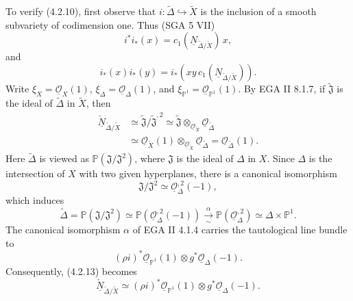 To verify (4.2.10), first observe that
$i:\widetilde\Delta\hookrightarrow\widetilde X$ is the inclusion of a
smooth subvariety of codimension one.  Thus (SGA 5 VII)
\begin{equation}\tag{4.2.11}
i^*i_*(x)=c_1(\underline N_{\widetilde\Delta/\widetilde X})\,x,
\end{equation}
and
\begin{equation}\tag{4.2.12}
i_*(x)i_*(y)
=i_*\!\left(xy\,c_1(\underline N_{\widetilde\Delta/\widetilde X})\right).
\end{equation}
Write
$\xi_X=\underline{\mathcal O}_X(1)$,
$\xi_\Delta=\underline{\mathcal O}_\Delta(1)$, and
$\xi_{\mathbb P^1}=\underline{\mathcal O}_{\mathbb P^1}(1)$.
By EGA II 8.1.7, if $\widetilde{\mathfrak J}$ is the ideal of
$\widetilde\Delta$ in $\widetilde X$, then
\begin{equation}\tag{4.2.13}
\begin{aligned}
\underline{\check N}_{\widetilde\Delta/\widetilde X}
&\simeq\widetilde{\mathfrak J}/\widetilde{\mathfrak J}^{,2}
 \simeq\widetilde{\mathfrak J}
       \otimes_{\underline{\mathcal O}_{\widetilde X}}
       \underline{\mathcal O}_{\widetilde\Delta}\\
&\simeq\underline{\mathcal O}_{\widetilde X}(1)
       \otimes_{\underline{\mathcal O}_{\widetilde X}}
       \underline{\mathcal O}_{\widetilde\Delta}
 =\underline{\mathcal O}_{\widetilde\Delta}(1).
\end{aligned}
\end{equation}
Here $\widetilde\Delta$ is viewed as
$\mathbb P(\mathfrak J/\mathfrak J^2)$, where $\mathfrak J$ is the ideal of
$\Delta$ in $X$.  Since $\Delta$ is the intersection of $X$ with two given
hyperplanes, there is a canonical isomorphism
\[
\mathfrak J/\mathfrak J^2\simeq
\underline{\mathcal O}_\Delta^{,2}(-1),
\]
which induces
\[
\widetilde\Delta=\mathbb P(\mathfrak J/\mathfrak J^2)
\simeq\mathbb P(\underline{\mathcal O}_\Delta^{,2}(-1))
\xrightarrow[\sim]{\alpha}
\mathbb P(\underline{\mathcal O}_\Delta^{,2})
\simeq\Delta\times\mathbb P^1.
\]
The canonical isomorphism $\alpha$ of EGA II 4.1.4 carries the tautological
line bundle to
\[
(\rho i)^*\underline{\mathcal O}_{\mathbb P^1}(1)
\otimes g^*\underline{\mathcal O}_\Delta(-1).
\]
Consequently, (4.2.13) becomes
\begin{equation}\tag{4.2.14}
\underline{\check N}_{\widetilde\Delta/\widetilde X}
\simeq(\rho i)^*\underline{\mathcal O}_{\mathbb P^1}(1)
       \otimes g^*\underline{\mathcal O}_\Delta(-1).
\end{equation}

